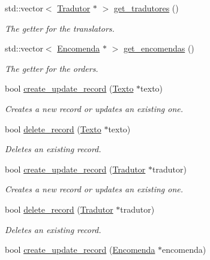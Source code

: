 \begin{DoxyCompactItemize}
std\-::vector$<$ \hyperlink{class_tradutor}{Tradutor} $\ast$ $>$ \hyperlink{class_database_manager_ad0f509067821ad15a9b25d86d2b515a4}{get\-\_\-tradutores} ()
\begin{DoxyCompactList}\small\item\em The getter for the translators. \end{DoxyCompactList}\item 
std\-::vector$<$ \hyperlink{class_encomenda}{Encomenda} $\ast$ $>$ \hyperlink{class_database_manager_a5c2b2ad77ee83de5b1fb2f07cdfc6736}{get\-\_\-encomendas} ()
\begin{DoxyCompactList}\small\item\em The getter for the orders. \end{DoxyCompactList}\item 
bool \hyperlink{class_database_manager_a10e0b6e056bcc0b669e272b839ae92fe}{create\-\_\-update\-\_\-record} (\hyperlink{class_texto}{Texto} $\ast$texto)
\begin{DoxyCompactList}\small\item\em Creates a new record or updates an existing one. \end{DoxyCompactList}\item 
bool \hyperlink{class_database_manager_aedc255310da21463f3297f3333898605}{delete\-\_\-record} (\hyperlink{class_texto}{Texto} $\ast$texto)
\begin{DoxyCompactList}\small\item\em Deletes an existing record. \end{DoxyCompactList}\item 
bool \hyperlink{class_database_manager_a587389f45912fee630df72658a4d09b0}{create\-\_\-update\-\_\-record} (\hyperlink{class_tradutor}{Tradutor} $\ast$tradutor)
\begin{DoxyCompactList}\small\item\em Creates a new record or updates an existing one. \end{DoxyCompactList}\item 
bool \hyperlink{class_database_manager_a861c8ab275b7d9e100ebb71889578c40}{delete\-\_\-record} (\hyperlink{class_tradutor}{Tradutor} $\ast$tradutor)
\begin{DoxyCompactList}\small\item\em Deletes an existing record. \end{DoxyCompactList}\item 
bool \hyperlink{class_database_manager_a10fd54af873e6902a3a6ee45f71eb42c}{create\-\_\-update\-\_\-record} (\hyperlink{class_encomenda}{Encomenda} $\ast$encomenda)

\end{DoxyCompactItemize}
